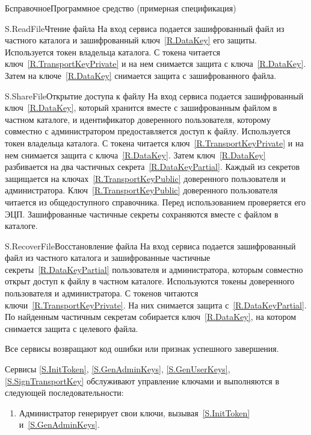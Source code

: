 \begin{appendix}{Б}{справочное}{Программное средство \CryptoDisk 
(примерная спецификация)}
\begin{definition}{S.ReadFile}{Чтение файла}
На вход сервиса подается зашифрованный файл из частного каталога
и зашифрованный ключ~\ref{R.DataKey} его защиты. 
%
Используется токен владельца каталога.
%
С токена читается ключ~\ref{R.TransportKeyPrivate}
и на нем снимается защита с ключа~\ref{R.DataKey}.
Затем на ключе~\ref{R.DataKey} снимается защита с зашифрованного файла.
\end{definition}

\begin{definition}{S.ShareFile}{Открытие доступа к файлу}
На вход сервиса подается зашифрованный ключ~\ref{R.DataKey},
который хранится вместе с зашифрованным файлом в частном каталоге,
и идентификатор доверенного пользователя, которому совместно с администратором 
предоставляется доступ к файлу.
%
Используется токен владельца каталога.
%
С токена читается ключ~\ref{R.TransportKeyPrivate}
и на нем снимается защита с ключа~\ref{R.DataKey}.
Затем ключ~\ref{R.DataKey} разбивается на два частичных 
секрета~\ref{R.DataKeyPartial}.
%
Каждый из секретов защищается на ключах~\ref{R.TransportKeyPublic} 
доверенного пользователя и администратора. 
%
Ключ~\ref{R.TransportKeyPublic} доверенного пользователя 
читается из общедоступного справочника. Перед использованием 
проверяется его ЭЦП.
%
Зашифрованные частичные секреты сохраняются вместе с файлом в каталоге.
\end{definition}

\begin{definition}{S.RecoverFile}{Восстановление файла}
На вход сервиса подается зашифрованный файл из частного каталога
и зашифрованные частичные секреты~\ref{R.DataKeyPartial}
пользователя и администратора, 
которым совместно открыт доступ к файлу в частном каталоге.
Используются токены доверенного пользователя и администратора.
%
С токенов читаются ключи~\ref{R.TransportKeyPrivate}.
На них снимается защита с~\ref{R.DataKeyPartial}. 
По найденным частичным секретам собирается ключ~\ref{R.DataKey}, 
на котором снимается защита с целевого файла.
\end{definition}

Все сервисы возвращают код ошибки или признак успешного завершения.

Сервисы \ref{S.InitToken}, \ref{S.GenAdminKeys}, \ref{S.GenUserKeys}, 
\ref{S.SignTransportKey} обслуживают управление ключами  
и выполняются в следующей последовательности:

\begin{enumerate}
\item
Администратор генерирует свои
ключи, вызывая~\ref{S.InitToken} и~\ref{S.GenAdminKeys}.


\end{enumerate}
\end{appendix}
